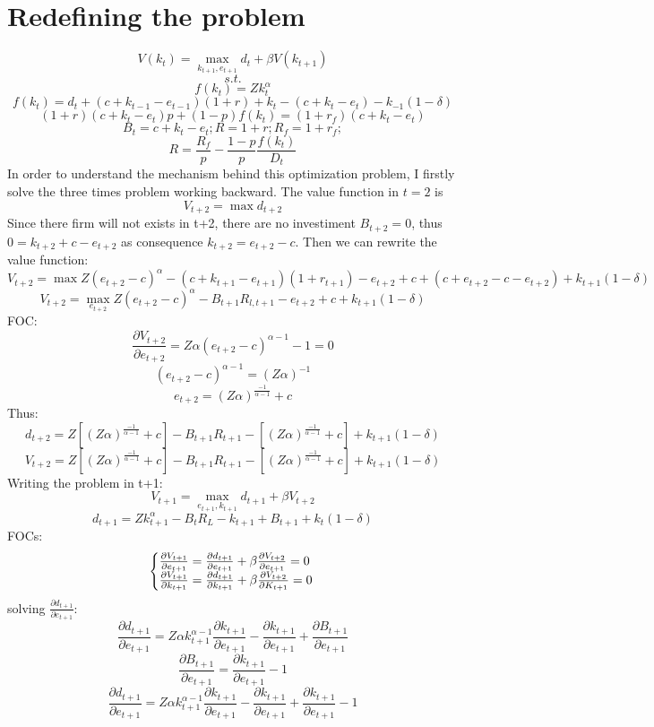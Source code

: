 \documentclass{article}
\begin{document}
\section{Redefining the problem}
\[V(k_{t}) = \max_{k_{t+1}, e_{t+1}} d_t + \beta V(k_{t+1})\]
\[s.t.\]
\[f(k_t) = Z k_t^\alpha\]
\[f(k_t) = d_t + (c+k_{t-1}-e_{t-1})(1+r) + k_{t} - (c + k_{t}- e_{t}) - k_{-1}(1-\delta)\]
\[(1+r)(c+k_t -e_t)p + (1-p)f(k_t) = (1+r_f)(c+k_t -e_t) \]
\[B_t = c+k_t-e_t; R= 1+r; R_f= 1 + r_f;  \]
\[R=\frac{R_f}{p}  -\frac{ 1-p }{ p }\frac{f(k_t)}{D_t}\]
In order to understand the mechanism behind this optimization problem, I firstly solve the three times problem working
backward.
The value function in \(t=2\) is 
\[ V_{t+2} =  \max d_{t+2}\]
Since there firm will not exists in t+2, there are no investiment \(B_{t+2}=0\), thus \(0=k_{t+2}+c-e_{t+2}\) as
consequence \(k_{t+2} = e_{t+2} - c\). Then we can rewrite the value function:
\[ V_{t+2} = \max Z(e_{t+2} - c)^\alpha - (c+k_{t+1}-e_{t+1})(1+r_{t+1}) - e_{t+2} + c + (c + e_{t+2} - c - e_{t+2}) +
k_{t+1}(1-\delta) \]
\[V_{t+2} = \max_{e_{t+2}} Z(e_{t+2} - c)^\alpha - B_{t+1}R_{l,t+1} - e_{t+2} + c + k_{t+1}(1-\delta) \]
FOC:
\[\frac{\partial V_{t+2}}{\partial e_{t+2}} = Z \alpha (e_{t+2} - c)^{\alpha-1} - 1 = 0\]
\[ (e_{t+2} - c)^{\alpha-1}= (Z \alpha)^{-1}\]
\[ e_{t+2} = (Z \alpha)^{\frac{-1}{\alpha-1}}+c\]
Thus:
\[d_{t+2} = Z\left[(Z \alpha)^{\frac{-1}{\alpha-1}}+c\right]  - B_{t+1}R_{t+1} -  \left[(Z
\alpha)^{\frac{-1}{\alpha-1}}+c\right] + k_{t+1}(1-\delta) \]
\[V_{t+2} = Z\left[(Z \alpha)^{\frac{-1}{\alpha-1}}+c\right]  - B_{t+1}R_{t+1} -  \left[(Z
\alpha)^{\frac{-1}{\alpha-1}}+c\right] + k_{t+1}(1-\delta)\] 
Writing the problem in t+1:
\[V_{t+1} = \max_{e_{t+1},k_{t+1}} d_{t+1} + \beta V_{t+2}\]
\[d_{t+1} = Zk^\alpha_{t+1} - B_t R_L - k_{t+1} + B_{t+1} + k_t(1-\delta)\]
FOCs:
\begin{equation}
    \left\{\begin{array}{@{}l@{}}
        \frac{\partial V_{t+1}}{\partial e_{t+1}} = \frac{\partial d_{t+1}}{\partial e_{t+1}} + \beta \frac{\partial
            V_{t+2}}{\partial e_{t+1}} = 0  \\
        \frac{\partial V_{t+1}}{\partial k_{t+1}} = \frac{\partial d_{t+1}}{\partial k_{t+1}} + \beta \frac{\partial
            V_{t+2}}{\partial K_{t+1}} = 0 \\
    \end{array} \right .\,
\end{equation}
solving \(\frac{\partial d_{t+1}}{\partial e_{t+1}}\):
\[\frac{\partial d_{t+1}}{\partial e_{t+1}} = Z \alpha k_{t+1} ^{\alpha-1}\frac{\partial k_{t+1}}{\partial e_{t+1}}
 - \frac{\partial k_{t+1}}{\partial e_{t+1}} + \frac{\partial B_{t+1}}{\partial e_{t+1}}\]
\[\frac{\partial B_{t+1}}{\partial e_{t+1}} = \frac{\partial k_{t+1}}{\partial e_{t+1}} - 1\]
\[\frac{\partial d_{t+1}}{\partial e_{t+1}} = Z \alpha k_{t+1} ^{\alpha-1}\frac{\partial k_{t+1}}{\partial e_{t+1}} -
\frac{\partial k_{t+1}}{\partial e_{t+1}} + \frac{\partial k_{t+1}}{\partial e_{t+1}} - 1\]
\end{document}
